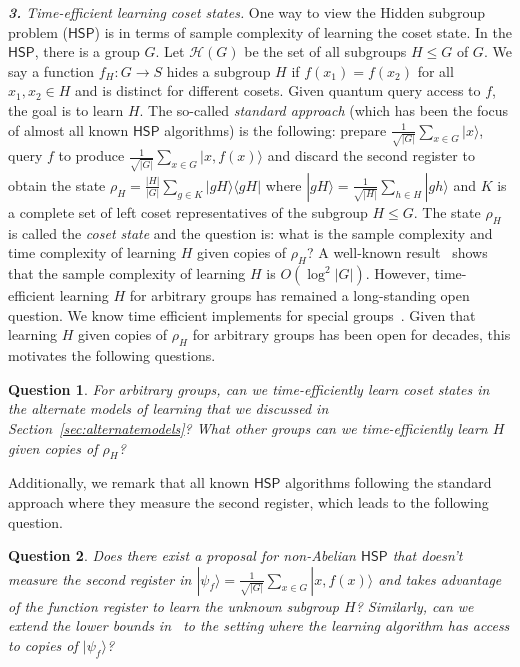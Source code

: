 \documentclass[11pt]{article}
\newcommand{\Hi}{\ensuremath{\mathcal{H}}}
\newcommand{\ket}[1]{|#1\rangle}
\newcommand{\ketbra}[2]{|#1\rangle\langle#2|}
\newtheorem{question}{Question}
\begin{document}
\emph{\textbf{3.} Time-efficient learning coset states.} One way to view the Hidden subgroup problem ($\mathsf{HSP}$) is in terms of sample complexity of learning the coset state. In the $\mathsf{HSP}$, there is a group $G$. Let $\Hi(G)$ be the set of all subgroups $H\leq G$ of $G$. We say a function $f_H:G\rightarrow S$ hides a subgroup $H$ if $f(x_1)=f(x_2)$ for all $x_1,x_2\in H$ and is distinct for different cosets. Given quantum query access to $f$, the goal is to learn $H$. The so-called \emph{standard approach} (which has been the focus of almost all known $\mathsf{HSP}$ algorithms) is the following: prepare $\frac{1}{\sqrt{|G|}}\sum_{x\in G}\ket{x}$, query $f$ to produce $\frac{1}{\sqrt{|G|}}\sum_{x\in G}\ket{x,f(x)}$ and discard the second register to obtain the state $\rho_H=\frac{|H|}{|G|}\sum_{g\in K}\ketbra{gH}{gH}$ where $\ket{gH}=\frac{1}{\sqrt{|H|}}\sum_{h\in H}\ket{gh}$ and $K$ is a complete set of left coset representatives of the subgroup $H\leq G$. The state $\rho_H$ is called the \emph{coset state} and the question is: what is the sample complexity and time complexity of learning $H$ given copies of $\rho_H$? A well-known result~\cite{DBLP:journals/ipl/EttingerHK04} shows that the sample complexity of learning $H$ is $O(\log^2 |G|)$. However, time-efficient learning $H$ for arbitrary groups has remained a long-standing open question. We know time efficient implements for special groups~\cite{DBLP:journals/cjtcs/BaconCD06,hallgren2000normal,DBLP:journals/eccc/ECCC-TR96-003,roetteler1998polynomial,Friedl2014hidden}. Given that learning $H$ given copies of $\rho_H$ for arbitrary groups has been open for decades, this motivates the following questions.

\begin{question}
For arbitrary groups, can we time-efficiently learn coset states in the alternate models of learning that we discussed in Section~\ref{sec:alternatemodels}? What other groups can we time-efficiently learn $H$ given copies of $\rho_H$?
\end{question} 

Additionally, we remark that all known $\mathsf{HSP}$ algorithms following the standard approach where they measure the second register, which leads to the following question.
\begin{question}
Does there exist a proposal for non-Abelian $\mathsf{HSP}$ that doesn't measure the second register in $\ket{\psi_f}=\frac{1}{\sqrt{|G|}}\sum_{x \in G}\ket{x,f(x)}$ and takes advantage of the function register to learn the unknown subgroup $H$? Similarly, can we extend the lower bounds in~\cite{DBLP:journals/jacm/HallgrenMRRS10} to the setting where the learning algorithm has access to copies of $\ket{\psi_f}$?
\end{question}
\end{document}
